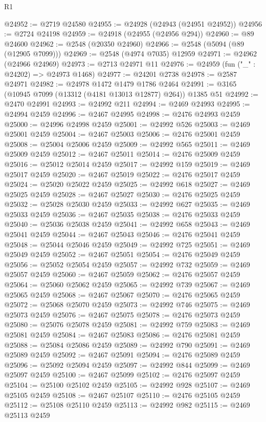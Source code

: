 \begin{lexlean}{R1}
\begin{coremodule}
@24952 := @2719 @24580
@24955 := @24928 (@24943 (@24951 @24952))
@24956 := @2724 @24198
@24959 := @24918 (@24955 (@24956 @294))
@24960 := @89 @24600
@24962 := @2548 (@20350 @24960)
@24966 := @2548 (@5094 (@89 (@12905 @7099)))
@24969 := @2548 (@4974 @7035) @12959
@24971 := @24962 (@24966 @24969)
@24973 := @2713 @24971 @11
@24976 := @24959 (fun ("_" : @24202) => @24973 @1468)
@24977 := @24201 @2738
@24978 := @2587 @24971
@24982 := @24978 @1472 @1479 @1786 @2464
@24991 := @3165 (@10945 @7099 (@13312 (@4181 @13013 @12877) @264)) @1385 @51
@24992 := @2470 @24991
@24993 := @24992 @211
@24994 := @2469 @24993
@24995 := @24994 @2459
@24996 := @2467 @24995
@24998 := @2476 @24993 @2459
@25000 := @24996 @24998 @2459
@25001 := @24992 @526
@25003 := @2469 @25001 @2459
@25004 := @2467 @25003
@25006 := @2476 @25001 @2459
@25008 := @25004 @25006 @2459
@25009 := @24992 @565
@25011 := @2469 @25009 @2459
@25012 := @2467 @25011
@25014 := @2476 @25009 @2459
@25016 := @25012 @25014 @2459
@25017 := @24992 @159
@25019 := @2469 @25017 @2459
@25020 := @2467 @25019
@25022 := @2476 @25017 @2459
@25024 := @25020 @25022 @2459
@25025 := @24992 @618
@25027 := @2469 @25025 @2459
@25028 := @2467 @25027
@25030 := @2476 @25025 @2459
@25032 := @25028 @25030 @2459
@25033 := @24992 @627
@25035 := @2469 @25033 @2459
@25036 := @2467 @25035
@25038 := @2476 @25033 @2459
@25040 := @25036 @25038 @2459
@25041 := @24992 @658
@25043 := @2469 @25041 @2459
@25044 := @2467 @25043
@25046 := @2476 @25041 @2459
@25048 := @25044 @25046 @2459
@25049 := @24992 @725
@25051 := @2469 @25049 @2459
@25052 := @2467 @25051
@25054 := @2476 @25049 @2459
@25056 := @25052 @25054 @2459
@25057 := @24992 @732
@25059 := @2469 @25057 @2459
@25060 := @2467 @25059
@25062 := @2476 @25057 @2459
@25064 := @25060 @25062 @2459
@25065 := @24992 @739
@25067 := @2469 @25065 @2459
@25068 := @2467 @25067
@25070 := @2476 @25065 @2459
@25072 := @25068 @25070 @2459
@25073 := @24992 @746
@25075 := @2469 @25073 @2459
@25076 := @2467 @25075
@25078 := @2476 @25073 @2459
@25080 := @25076 @25078 @2459
@25081 := @24992 @759
@25083 := @2469 @25081 @2459
@25084 := @2467 @25083
@25086 := @2476 @25081 @2459
@25088 := @25084 @25086 @2459
@25089 := @24992 @790
@25091 := @2469 @25089 @2459
@25092 := @2467 @25091
@25094 := @2476 @25089 @2459
@25096 := @25092 @25094 @2459
@25097 := @24992 @844
@25099 := @2469 @25097 @2459
@25100 := @2467 @25099
@25102 := @2476 @25097 @2459
@25104 := @25100 @25102 @2459
@25105 := @24992 @928
@25107 := @2469 @25105 @2459
@25108 := @2467 @25107
@25110 := @2476 @25105 @2459
@25112 := @25108 @25110 @2459
@25113 := @24992 @982
@25115 := @2469 @25113 @2459

\end{coremodule}
\end{lexlean}

